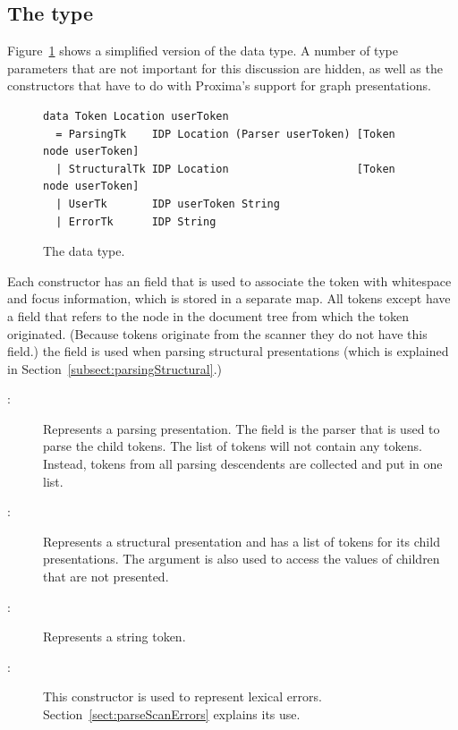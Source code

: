 \documentclass[12pt]{article}
\begin{document}

\subsection{The  type}

Figure~\ref{fig:tokenType} shows a simplified version of the  data type. A number of type parameters that are not important for this discussion are hidden, as well as the constructors that have to do with Proxima's support for graph presentations. 

\begin{figure}
\begin{center}
\begin{footnotesize}
\begin{verbatim}
data Token Location userToken 
  = ParsingTk    IDP Location (Parser userToken) [Token node userToken]
  | StructuralTk IDP Location                    [Token node userToken]
  | UserTk       IDP userToken String 
  | ErrorTk      IDP String 
\end{verbatim}
\end{footnotesize}
\caption{The  data type.} \label{fig:tokenType} 
\end{center}
\end{figure}


Each constructor has an  field that is used to associate the token with whitespace and focus information, which is stored in a separate map. All tokens except  have a  field that refers to the node in the document tree from which the token originated. (Because  tokens originate from the scanner they do not have this field.) the  field is used when parsing structural presentations (which is explained in Section~\ref{subsect:parsingStructural}.)

\begin{description}
\item[:] Represents a parsing presentation. The field  is the parser that is used to parse the child tokens. The list of tokens will not contain any  tokens. Instead, tokens from all parsing descendents are collected and put in one list. \\
\item[:] Represents a structural presentation and has a list of tokens for its child presentations. The  argument is also used to access the values of children that are not presented. 
\item[:] Represents a string token. %
\item[:] This constructor is used to represent lexical errors. Section~\ref{sect:parseScanErrors} explains its use. \\
\end{description}
\end{document}
